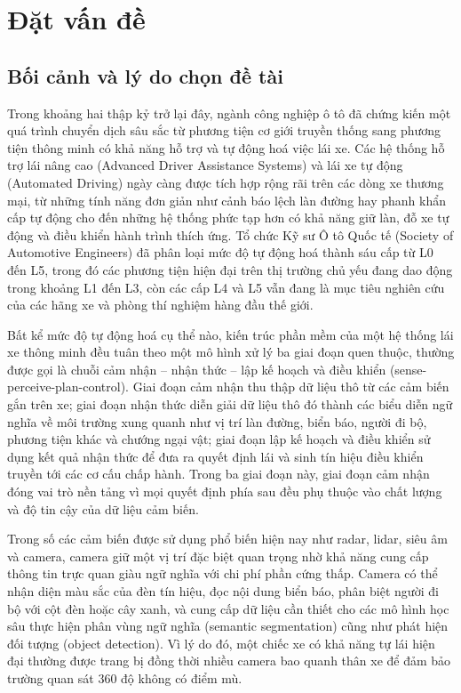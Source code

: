 
\chapter{Đặt vấn đề}

\section{Bối cảnh và lý do chọn đề tài}

Trong khoảng hai thập kỷ trở lại đây, ngành công nghiệp ô tô đã chứng kiến một quá trình chuyển dịch sâu sắc từ phương tiện cơ giới truyền thống sang phương tiện thông minh có khả năng hỗ trợ và tự động hoá việc lái xe. Các hệ thống hỗ trợ lái nâng cao (Advanced Driver Assistance Systems) và lái xe tự động (Automated Driving) ngày càng được tích hợp rộng rãi trên các dòng xe thương mại, từ những tính năng đơn giản như cảnh báo lệch làn đường hay phanh khẩn cấp tự động cho đến những hệ thống phức tạp hơn có khả năng giữ làn, đỗ xe tự động và điều khiển hành trình thích ứng. Tổ chức Kỹ sư Ô tô Quốc tế (Society of Automotive Engineers) đã phân loại mức độ tự động hoá thành sáu cấp từ L0 đến L5, trong đó các phương tiện hiện đại trên thị trường chủ yếu đang dao động trong khoảng L1 đến L3, còn các cấp L4 và L5 vẫn đang là mục tiêu nghiên cứu của các hãng xe và phòng thí nghiệm hàng đầu thế giới.

Bất kể mức độ tự động hoá cụ thể nào, kiến trúc phần mềm của một hệ thống lái xe thông minh đều tuân theo một mô hình xử lý ba giai đoạn quen thuộc, thường được gọi là chuỗi cảm nhận -- nhận thức -- lập kế hoạch và điều khiển (sense-perceive-plan-control). Giai đoạn cảm nhận thu thập dữ liệu thô từ các cảm biến gắn trên xe; giai đoạn nhận thức diễn giải dữ liệu thô đó thành các biểu diễn ngữ nghĩa về môi trường xung quanh như vị trí làn đường, biển báo, người đi bộ, phương tiện khác và chướng ngại vật; giai đoạn lập kế hoạch và điều khiển sử dụng kết quả nhận thức để đưa ra quyết định lái và sinh tín hiệu điều khiển truyền tới các cơ cấu chấp hành. Trong ba giai đoạn này, giai đoạn cảm nhận đóng vai trò nền tảng vì mọi quyết định phía sau đều phụ thuộc vào chất lượng và độ tin cậy của dữ liệu cảm biến.

Trong số các cảm biến được sử dụng phổ biến hiện nay như radar, lidar, siêu âm và camera, camera giữ một vị trí đặc biệt quan trọng nhờ khả năng cung cấp thông tin trực quan giàu ngữ nghĩa với chi phí phần cứng thấp. Camera có thể nhận diện màu sắc của đèn tín hiệu, đọc nội dung biển báo, phân biệt người đi bộ với cột đèn hoặc cây xanh, và cung cấp dữ liệu cần thiết cho các mô hình học sâu thực hiện phân vùng ngữ nghĩa (semantic segmentation) cũng như phát hiện đối tượng (object detection). Vì lý do đó, một chiếc xe có khả năng tự lái hiện đại thường được trang bị đồng thời nhiều camera bao quanh thân xe để đảm bảo trường quan sát 360 độ không có điểm mù.

